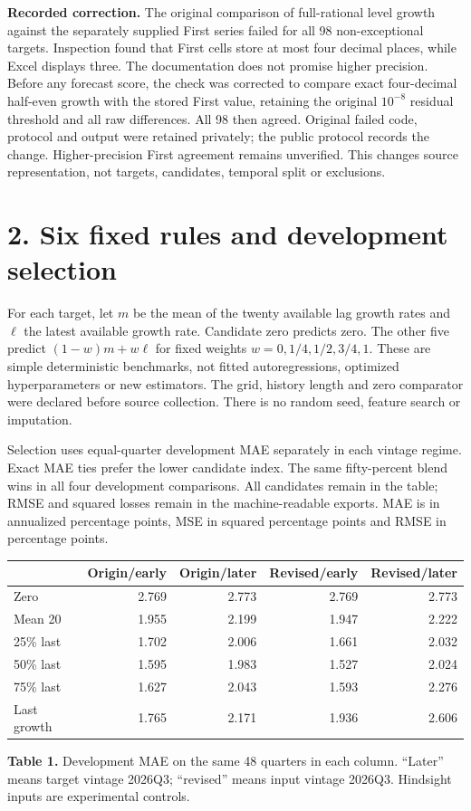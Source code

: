 \documentclass[10pt,letterpaper]{article}
\begin{document}
\textbf{Recorded correction.} The original comparison of full-rational level growth against the separately supplied First series failed for all 98 non-exceptional targets. Inspection found that First cells store at most four decimal places, while Excel displays three. The documentation does not promise higher precision. Before any forecast score, the check was corrected to compare exact four-decimal half-even growth with the stored First value, retaining the original $10^{-8}$ residual threshold and all raw differences. All 98 then agreed. Original failed code, protocol and output were retained privately; the public protocol records the change. Higher-precision First agreement remains unverified. This changes source representation, not targets, candidates, temporal split or exclusions.
\newpage
\section*{2. Six fixed rules and development selection}
For each target, let $m$ be the mean of the twenty available lag growth rates and $\ell$ the latest available growth rate. Candidate zero predicts zero. The other five predict $(1-w)m+w\ell$ for fixed weights $w=0,1/4,1/2,3/4,1$. These are simple deterministic benchmarks, not fitted autoregressions, optimized hyperparameters or new estimators. The grid, history length and zero comparator were declared before source collection. There is no random seed, feature search or imputation.

Selection uses equal-quarter development MAE separately in each vintage regime. Exact MAE ties prefer the lower candidate index. The same fifty-percent blend wins in all four development comparisons. All candidates remain in the table; RMSE and squared losses remain in the machine-readable exports. MAE is in annualized percentage points, MSE in squared percentage points and RMSE in percentage points.

\begin{center}\small\begin{tabular}{lrrrr}\toprule
 & Origin/early & Origin/later & Revised/early & Revised/later\\\midrule
Zero & 2.769 & 2.773 & 2.769 & 2.773 \\
Mean 20 & 1.955 & 2.199 & 1.947 & 2.222 \\
25\% last & 1.702 & 2.006 & 1.661 & 2.032 \\
50\% last & 1.595 & 1.983 & 1.527 & 2.024 \\
75\% last & 1.627 & 2.043 & 1.593 & 2.276 \\
Last growth & 1.765 & 2.171 & 1.936 & 2.606 \\
\bottomrule\end{tabular}\end{center}
\textbf{Table 1.} Development MAE on the same 48 quarters in each column. ``Later'' means target vintage 2026Q3; ``revised'' means input vintage 2026Q3. Hindsight inputs are experimental controls.
\end{document}
